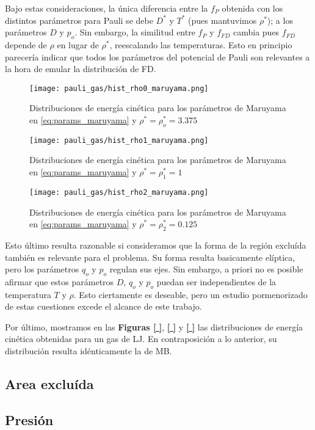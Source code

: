 Bajo estas consideraciones, la única diferencia entre la $f_P$ obtenida con los distintos parámetros para Pauli se debe $D^*$ y $T^*$ (pues mantuvimos $\rho^*$); a los parámetros $D$ y $p_o$.
Sin embargo, la similitud entre $f_P$ y $f_{FD}$ cambia pues $f_{FD}$ depende de $\rho$ en lugar de $\rho^*$, reescalando las temperaturas.
Esto en principio parecería indicar que todos los parámetros del potencial de Pauli son relevantes a la hora de emular la distribución de FD.

\begin{figure}[H]
	\centering
	\texttt{[image: pauli\_gas/hist\_rho0\_maruyama.png]}
	\caption{Distribuciones de energía cinética para los parámetros de Maruyama en \eqref{eq:params_maruyama} y $\rho^* = \rho_o^* = 3.375$}
	\label{fig:hist_rho0_maruyama}
\end{figure}

\begin{figure}[H]
	\centering
	\texttt{[image: pauli\_gas/hist\_rho1\_maruyama.png]}
	\caption{Distribuciones de energía cinética para los parámetros de Maruyama en \eqref{eq:params_maruyama} y $\rho^* = \rho_1^* = 1$}
	\label{fig:hist_rho1_maruyama}
\end{figure}
\begin{figure}[H]
	\centering
	\texttt{[image: pauli\_gas/hist\_rho2\_maruyama.png]}
	\caption{Distribuciones de energía cinética para los parámetros de Maruyama en \eqref{eq:params_maruyama} y $\rho^* = \rho_2^* = 0.125$}
	\label{fig:hist_rho2_maruyama}
\end{figure}

Esto último resulta razonable si consideramos que la forma de la región excluída también es relevante para el problema.
Su forma resulta basicamente elíptica, pero los parámetros $q_o$ y $p_o$ regulan sus ejes.
Sin embargo, a priori no es posible afirmar que estos parámetros $D$, $q_o$ y $p_o$ puedan ser independientes de la temperatura $T$ y $\rho$.
Esto ciertamente es deseable, pero un estudio pormenorizado de estas cuestiones excede el alcance de este trabajo.

Por último, mostramos en las \textbf{Figuras \ref{ }}, \textbf{\ref{ }} y \textbf{\ref{ }} las distribuciones de energía cinética obtenidas para un gas de LJ.
En contraposición a lo anterior, su distribución resulta idénticamente la de MB.


\subsection{Area excluída}



\subsection{Presión}